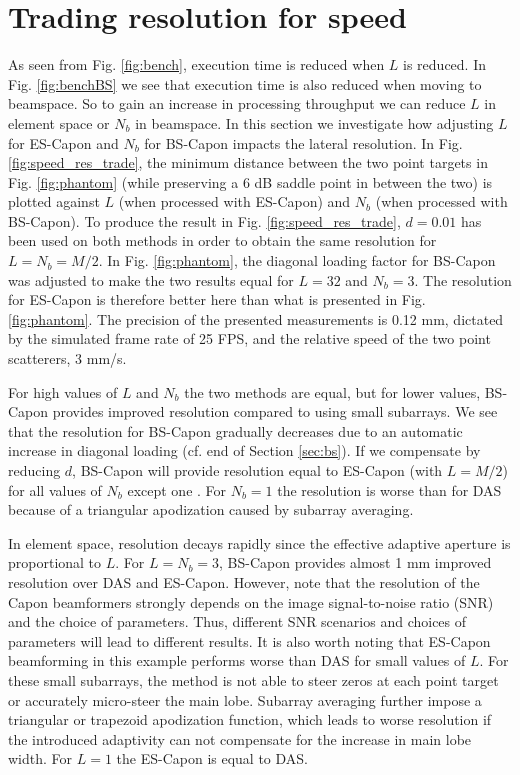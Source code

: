 \documentclass[journal]{IEEEtran}
\begin{document}
\section{Trading resolution for speed}\label{sec:trade}
As seen from Fig. \ref{fig:bench}, execution time is reduced when $L$ is reduced. In Fig. \ref{fig:benchBS} we see that execution time is also reduced when moving to beamspace. So to gain an  increase in processing throughput we can reduce $L$ in element space or $N_b$ in beamspace. In this section we investigate how adjusting $L$ for ES-Capon and $N_b$ for BS-Capon impacts the lateral resolution. In Fig. \ref{fig:speed_res_trade}, the minimum distance between the two point targets in Fig. \ref{fig:phantom} (while preserving a 6 dB saddle point in between the two) is plotted against $L$ (when processed with ES-Capon) and $N_b$ (when processed with BS-Capon). To produce the result in Fig. \ref{fig:speed_res_trade}, $d=0.01$ has been used on both methods in order to obtain the same resolution for $L=N_b=M/2$. 
In Fig. \ref{fig:phantom}, the diagonal loading factor for BS-Capon was adjusted to make the two results equal for $L=32$ and $N_b=3$. The resolution for ES-Capon is therefore better here than what is presented in Fig. \ref{fig:phantom}. 
The precision of the presented measurements is 0.12 mm, dictated by the simulated frame rate of 25 FPS, and the relative speed of the two point scatterers, 3 mm/s.

For high values of $L$ and $N_b$ the two methods are equal, but for lower values, BS-Capon provides improved resolution compared to using small subarrays. We see that the resolution for BS-Capon gradually decreases due to an automatic increase in diagonal loading (cf. end of Section \ref{sec:bs}). If we compensate by reducing $d$, BS-Capon will provide resolution equal to ES-Capon (with $L=M/2$) for all values of $N_b$ except one \cite{Nilsen2009}. For $N_b=1$ the resolution is worse than for DAS because of a triangular apodization caused by subarray averaging. 

In element space, resolution decays rapidly since the effective adaptive aperture is proportional to $L$. For $L = N_b=3$, BS-Capon provides almost 1 mm improved resolution over DAS and ES-Capon. However, note that the resolution of the Capon beamformers strongly depends on the image signal-to-noise ratio (SNR) and the choice of parameters. Thus, different SNR scenarios and choices of parameters will lead to different results. It is also worth noting that ES-Capon beamforming in this example performs worse than DAS for small values of $L$. For these small subarrays, the method is not able to steer zeros at each point target or accurately micro-steer the main lobe. Subarray averaging further impose a triangular or trapezoid apodization function, which leads to worse resolution if the introduced adaptivity can not compensate for the increase in main lobe width. For $L=1$ the ES-Capon is equal to DAS.
\end{document}
